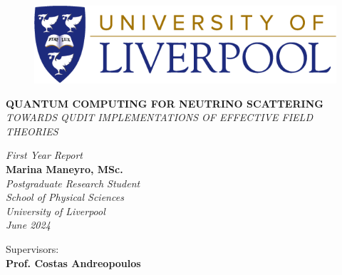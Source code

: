 
\changefontsizes{13pt}

\begin{titlepage}

\clearpage
{}
\begin{figure}[ht]
	\centering
    \includegraphics[scale=0.32]{UoL - Logo - CMYK.png}
\end{figure}
\vspace{3mm}

\begin{center}

    \Large{\textbf{\uppercase{Quantum Computing for Neutrino Scattering}}} \\    \vspace{2mm}
    \large{\textit{\uppercase{Towards Qudit implementations of Effective Field Theories}}}
    
	\vspace{18mm}
	\normalsize{\textit{First Year Report}}\\
	\vspace{7mm}
	\large{\textbf{Marina Maneyro, MSc.}}\\
	\vspace{2mm}
	\textit{\small Postgraduate Research Student\\ School of Physical Sciences \\
    \small{University of Liverpool}\\June 2024}
\end{center}
\vspace{24mm}


\begin{center}
    \normalsize{Supervisors:}\vspace{3mm}
	\\ \normalsize{\textbf{Prof. Costas Andreopoulos}}\\
	
 	\vspace{1.8mm}
 	

\end{center}
\end{titlepage}
